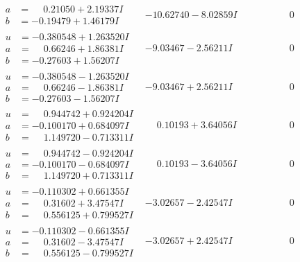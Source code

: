 \documentclass[1p]{elsarticle_modified}
\theoremstyle{definition}
\begin{document}
$$\begin{array}{c|c|c}
\begin{aligned}
a &= \phantom{-}0.21050 + 2.19337 I \\
b &= -0.19479 + 1.46179 I\end{aligned}
 & -10.62740 - 8.02859 I & \phantom{-0.000000 } 0 \\ \hline\begin{aligned}
u &= -0.380548 + 1.263520 I \\
a &= \phantom{-}0.66246 + 1.86381 I \\
b &= -0.27603 + 1.56207 I\end{aligned}
 & -9.03467 - 2.56211 I & \phantom{-0.000000 } 0 \\ \hline\begin{aligned}
u &= -0.380548 - 1.263520 I \\
a &= \phantom{-}0.66246 - 1.86381 I \\
b &= -0.27603 - 1.56207 I\end{aligned}
 & -9.03467 + 2.56211 I & \phantom{-0.000000 } 0 \\ \hline\begin{aligned}
u &= \phantom{-}0.944742 + 0.924204 I \\
a &= -0.100170 + 0.684097 I \\
b &= \phantom{-}1.149720 - 0.713311 I\end{aligned}
 & \phantom{-}0.10193 + 3.64056 I & \phantom{-0.000000 } 0 \\ \hline\begin{aligned}
u &= \phantom{-}0.944742 - 0.924204 I \\
a &= -0.100170 - 0.684097 I \\
b &= \phantom{-}1.149720 + 0.713311 I\end{aligned}
 & \phantom{-}0.10193 - 3.64056 I & \phantom{-0.000000 } 0 \\ \hline\begin{aligned}
u &= -0.110302 + 0.661355 I \\
a &= \phantom{-}0.31602 + 3.47547 I \\
b &= \phantom{-}0.556125 + 0.799527 I\end{aligned}
 & -3.02657 - 2.42547 I & \phantom{-0.000000 } 0 \\ \hline\begin{aligned}
u &= -0.110302 - 0.661355 I \\
a &= \phantom{-}0.31602 - 3.47547 I \\
b &= \phantom{-}0.556125 - 0.799527 I\end{aligned}
 & -3.02657 + 2.42547 I & \phantom{-0.000000 } 0\\

\end{array}$$
\end{document}
